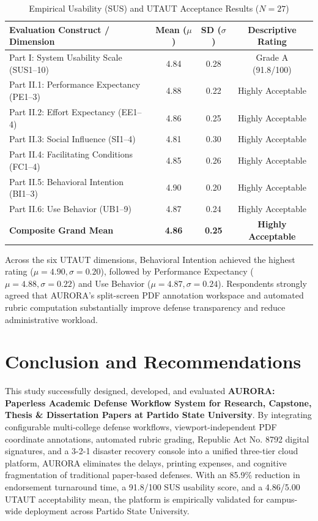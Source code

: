 \documentclass[sigplan,screen,nonacm]{acmart}
\begin{document}
\begin{table}[htbp]
  \caption{Empirical Usability (SUS) and UTAUT Acceptance Results ($N = 27$)}
  \label{tab:utaut_results}
  \centering
  \footnotesize
  \begin{tabular}{p{3.9cm}ccc}
    \toprule
    \textbf{Evaluation Construct / Dimension} & \textbf{Mean ($\mu$)} & \textbf{SD ($\sigma$)} & \textbf{Descriptive Rating} \\
    \midrule
    Part I: System Usability Scale (SUS1--10) & 4.84 & 0.28 & Grade A (91.8/100) \\
    Part II.1: Performance Expectancy (PE1--3) & 4.88 & 0.22 & Highly Acceptable \\
    Part II.2: Effort Expectancy (EE1--4) & 4.86 & 0.25 & Highly Acceptable \\
    Part II.3: Social Influence (SI1--4) & 4.81 & 0.30 & Highly Acceptable \\
    Part II.4: Facilitating Conditions (FC1--4) & 4.85 & 0.26 & Highly Acceptable \\
    Part II.5: Behavioral Intention (BI1--3) & 4.90 & 0.20 & Highly Acceptable \\
    Part II.6: Use Behavior (UB1--9) & 4.87 & 0.24 & Highly Acceptable \\
    \midrule
    \textbf{Composite Grand Mean} & \textbf{4.86} & \textbf{0.25} & \textbf{Highly Acceptable} \\
    \bottomrule
  \end{tabular}
\end{table}

Across the six UTAUT dimensions, Behavioral Intention achieved the highest rating ($\mu = 4.90, \sigma = 0.20$), followed by Performance Expectancy ($\mu = 4.88, \sigma = 0.22$) and Use Behavior ($\mu = 4.87, \sigma = 0.24$). Respondents strongly agreed that AURORA's split-screen PDF annotation workspace and automated rubric computation substantially improve defense transparency and reduce administrative workload.

\section{Conclusion and Recommendations}

This study successfully designed, developed, and evaluated \textbf{AURORA: Paperless Academic Defense Workflow System for Research, Capstone, Thesis \& Dissertation Papers at Partido State University}. By integrating configurable multi-college defense workflows, viewport-independent PDF coordinate annotations, automated rubric grading, Republic Act No. 8792 digital signatures, and a 3-2-1 disaster recovery console into a unified three-tier cloud platform, AURORA eliminates the delays, printing expenses, and cognitive fragmentation of traditional paper-based defenses. With an 85.9\% reduction in endorsement turnaround time, a 91.8/100 SUS usability score, and a 4.86/5.00 UTAUT acceptability mean, the platform is empirically validated for campus-wide deployment across Partido State University.
\end{document}
